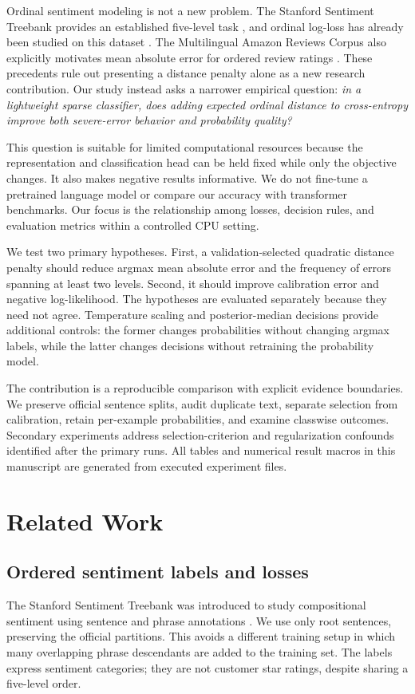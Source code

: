 \documentclass[10pt,twocolumn]{article}
\begin{document}
Ordinal sentiment modeling is not a new problem. The Stanford Sentiment Treebank provides an established five-level task \cite{socher2013}, and ordinal log-loss has already been studied on this dataset \cite{castagnos2022}. The Multilingual Amazon Reviews Corpus also explicitly motivates mean absolute error for ordered review ratings \cite{keung2020}. These precedents rule out presenting a distance penalty alone as a new research contribution. Our study instead asks a narrower empirical question: \emph{in a lightweight sparse classifier, does adding expected ordinal distance to cross-entropy improve both severe-error behavior and probability quality?}

This question is suitable for limited computational resources because the representation and classification head can be held fixed while only the objective changes. It also makes negative results informative. We do not fine-tune a pretrained language model or compare our accuracy with transformer benchmarks. Our focus is the relationship among losses, decision rules, and evaluation metrics within a controlled CPU setting.

We test two primary hypotheses. First, a validation-selected quadratic distance penalty should reduce argmax mean absolute error and the frequency of errors spanning at least two levels. Second, it should improve calibration error and negative log-likelihood. The hypotheses are evaluated separately because they need not agree. Temperature scaling and posterior-median decisions provide additional controls: the former changes probabilities without changing argmax labels, while the latter changes decisions without retraining the probability model.

The contribution is a reproducible comparison with explicit evidence boundaries. We preserve official sentence splits, audit duplicate text, separate selection from calibration, retain per-example probabilities, and examine classwise outcomes. Secondary experiments address selection-criterion and regularization confounds identified after the primary runs. All tables and numerical result macros in this manuscript are generated from executed experiment files.

\section{Related Work}
\subsection{Ordered sentiment labels and losses}
The Stanford Sentiment Treebank was introduced to study compositional sentiment using sentence and phrase annotations \cite{socher2013}. We use only root sentences, preserving the official partitions. This avoids a different training setup in which many overlapping phrase descendants are added to the training set. The labels express sentiment categories; they are not customer star ratings, despite sharing a five-level order.
\end{document}
